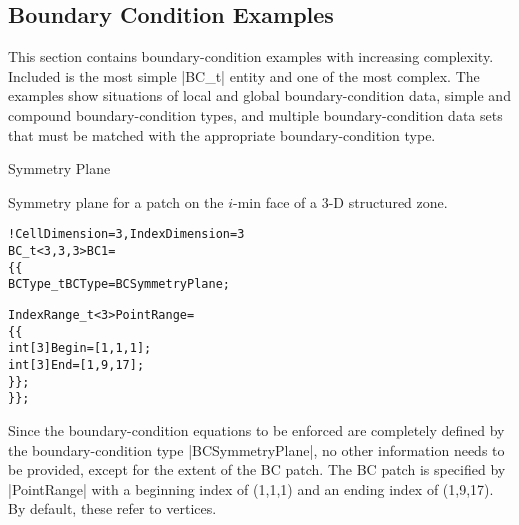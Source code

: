 \subsection{Boundary Condition Examples}  
\label{s:BCexample}

This section contains boundary-condition examples with increasing
complexity.  Included is the most simple |BC_t| entity and one of
the most complex.  The examples show situations of local and global
boundary-condition data, simple and compound boundary-condition types,
and multiple boundary-condition data sets that must be matched with the
appropriate boundary-condition type.

\begin{example}{Symmetry Plane}
\label{ex:bc1}

Symmetry plane for a patch on the $i$-min face of a 3-D structured zone.  
\begin{alltt}
  !  CellDimension = 3, IndexDimension = 3
  BC\_t<3,3,3> BC1 =
    \{\{
    BCType\_t BCType = BCSymmetryPlane ;

    IndexRange\_t<3> PointRange =
      \{\{
      int[3] Begin = [1,1,1 ] ;
      int[3] End   = [1,9,17] ;
      \}\} ;
    \}\} ;
\end{alltt}
Since the boundary-condition equations to be enforced are completely
defined by the boundary-condition type |BCSymmetryPlane|, no other
information needs to be provided, except for the extent of the BC patch.
The BC patch is specified by |PointRange| with a beginning index of
(1,1,1) and an ending index of (1,9,17).
By default, these refer to vertices.
\end{example}

